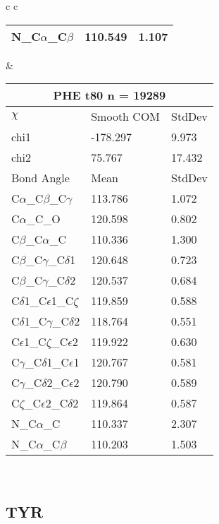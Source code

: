 \begin{longtable}{ c c }
\begin{tabular}{ l l l }
  N\_C$\alpha$\_C$\beta$ & 110.549 & 1.107\\
  \bottomrule
  \end{tabular}
  &
  \begin{tabular}{ l l l }
  \toprule
  \multicolumn{3}{c}{PHE \textbf{t80} n = 19289} \\ \toprule
  $\chi$       & Smooth COM & StdDev \\ \midrule
  chi1 & -178.297 & 9.973 \\ 
  chi2 & 75.767 & 17.432 \\ \midrule
  Bond Angle   & Mean     & StdDev \\ \midrule
  C$\alpha$\_C$\beta$\_C$\gamma$ & 113.786 & 1.072\\
  C$\alpha$\_C\_O & 120.598 & 0.802\\
  C$\beta$\_C$\alpha$\_C & 110.336 & 1.300\\
  C$\beta$\_C$\gamma$\_C$\delta$1 & 120.648 & 0.723\\
  C$\beta$\_C$\gamma$\_C$\delta$2 & 120.537 & 0.684\\
  C$\delta$1\_C$\epsilon$1\_C$\zeta$ & 119.859 & 0.588\\
  C$\delta$1\_C$\gamma$\_C$\delta$2 & 118.764 & 0.551\\
  C$\epsilon$1\_C$\zeta$\_C$\epsilon$2 & 119.922 & 0.630\\
  C$\gamma$\_C$\delta$1\_C$\epsilon$1 & 120.767 & 0.581\\
  C$\gamma$\_C$\delta$2\_C$\epsilon$2 & 120.790 & 0.589\\
  C$\zeta$\_C$\epsilon$2\_C$\delta$2 & 119.864 & 0.587\\
  N\_C$\alpha$\_C & 110.337 & 2.307\\
  N\_C$\alpha$\_C$\beta$ & 110.203 & 1.503\\
  \bottomrule
  \end{tabular}
  \\
  
\end{longtable}    

\newpage
\subsection{TYR}

